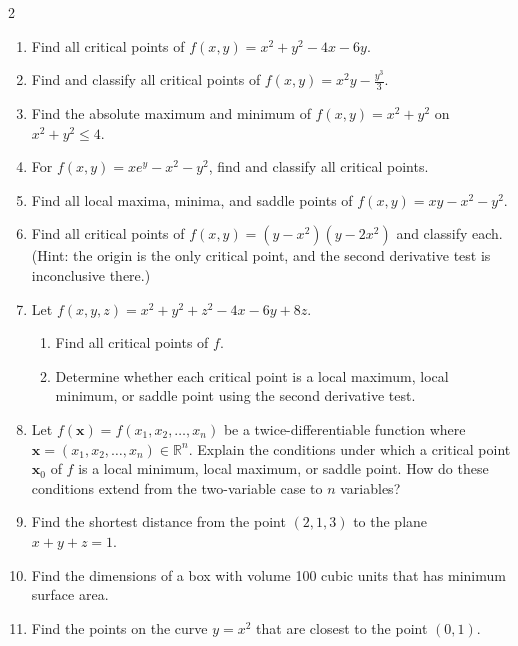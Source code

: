 \begin{multicols}{2}
\begin{enumerate}
    \item Find all critical points of $f(x,y) = x^2 + y^2 - 4x - 6y$.
    
    \item Find and classify all critical points of $f(x,y) = x^2y - \frac{y^3}{3}$.
    
    \item Find the absolute maximum and minimum of $f(x,y) = x^2 + y^2$ on $x^2 + y^2 \leq 4$.
    
    \item For $f(x,y) = xe^y - x^2 - y^2$, find and classify all critical points.
    
    \item Find all local maxima, minima, and saddle points of $f(x,y) = xy - x^2 - y^2$.
    
    \item Find all critical points of $f(x,y) = (y-x^2)(y-2x^2)$ and classify each. (Hint: the origin is the only critical point, and the second derivative test is inconclusive there.)

    \item  Let \( f(x,y,z) = x^2 + y^2 + z^2 - 4x - 6y + 8z \).
    \begin{enumerate}
        \item Find all critical points of \( f \).
        \item Determine whether each critical point is a local maximum, local minimum, or saddle point using the second derivative test.
    \end{enumerate}
    
    \item Let \( f(\mathbf{x}) = f(x_1, x_2, \dots, x_n) \) be a twice-differentiable function where \( \mathbf{x} = (x_1, x_2, \dots, x_n) \in \mathbb{R}^n \). Explain the conditions under which a critical point \( \mathbf{x}_0 \) of \( f \) is a local minimum, local maximum, or saddle point. How do these conditions extend from the two-variable case to \( n \) variables?

    \item Find the shortest distance from the point $(2,1,3)$ to the plane $x + y + z = 1$.
    
    \item Find the dimensions of a box with volume 100 cubic units that has minimum surface area.
    
    \item Find the points on the curve $y = x^2$ that are closest to the point $(0,1)$.
    

\end{enumerate}
\end{multicols}
